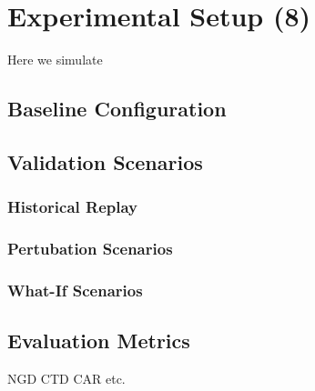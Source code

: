 \chapter{Experimental Setup (8)}
\label{chp:experimental_setup}

Here we simulate

\section{Baseline Configuration}

\section{Validation Scenarios}

\subsection{Historical Replay}
\subsection{Pertubation Scenarios}
\subsection{What-If Scenarios}

\section{Evaluation Metrics}
NGD
CTD
CAR etc. 